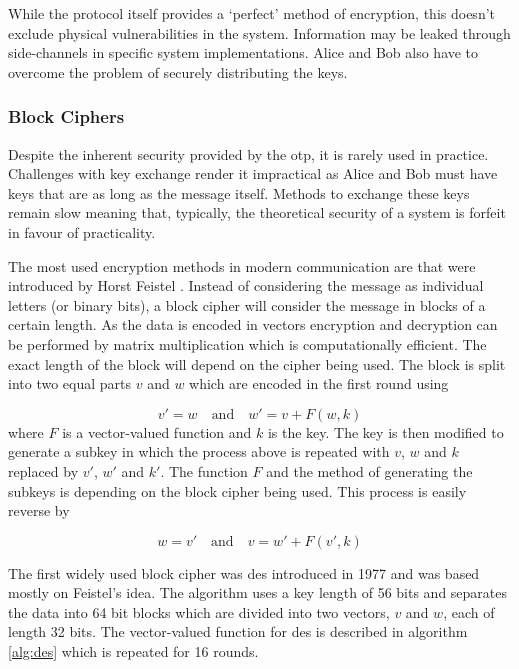 
While the protocol itself provides a `perfect' method of encryption, this doesn't exclude physical vulnerabilities in the system. Information may be leaked through side-channels in specific system implementations. Alice and Bob also have to overcome the problem of securely distributing the keys. 

\subsubsection{Block Ciphers}

Despite the inherent security provided by the \ac{otp}, it is rarely used in practice. Challenges with key exchange render it impractical as Alice and Bob must have keys that are as long as the message itself. Methods to exchange these keys remain slow meaning that, typically, the theoretical security of a system is forfeit in favour of practicality. 

The most used encryption methods in modern communication are  that were introduced by Horst Feistel \cite{feistel1970cryptographic}. Instead of considering the message as individual letters (or binary bits), a block cipher will consider the message in blocks of a certain length. As the data is encoded in vectors encryption and decryption can be performed by matrix multiplication which is computationally efficient. The exact length of the block will depend on the cipher being used. The block is split into two equal parts $v$ and $w$ which are encoded in the first round using 

\begin{equation}
	v' = w \quad \text{and} \quad w' = v + F(w, k)
\end{equation}
where $F$ is a vector-valued function and $k$ is the key. The key is then modified to generate a subkey in which the process above is repeated with $v$, $w$ and $k$ replaced by $v'$, $w'$ and $k'$. The function $F$ and the method of generating the subkeys is depending on the block cipher being used. This process is easily reverse by

\begin{equation}
	w = v' \quad \text{and} \quad v = w' + F(v', k)
\end{equation}

The first widely used block cipher was \ac{des} introduced in 1977 \cite{DES1977} and was based mostly on Feistel's idea. The algorithm uses a key length of 56 bits and separates the data into 64 bit blocks which are divided into two vectors, $v$ and $w$, each of length 32 bits. The vector-valued function for \ac{des} is described in algorithm \ref{alg:des} which is repeated for 16 rounds.

